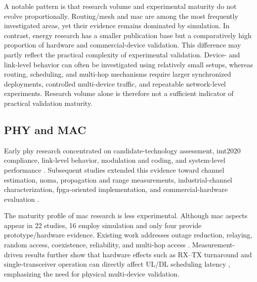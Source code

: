 \documentclass[conference]{IEEEtran}
\begin{document}
A notable pattern is that research volume and experimental maturity
do not evolve proportionally. Routing/mesh and \gls{mac} are among
the most frequently investigated areas, yet their evidence remains
dominated by simulation. In contrast, energy research has a smaller
publication base but a comparatively high proportion of hardware and
commercial-device validation. This difference may partly reflect the
practical complexity of experimental validation. Device- and
link-level behavior can often be investigated using relatively small
setups, whereas routing, scheduling, and multi-hop mechanisms require
larger synchronized deployments, controlled multi-device traffic, and
repeatable network-level experiments. Research volume alone is
therefore not a sufficient indicator of practical validation maturity.


\subsection{PHY and MAC}
\label{subsec:phy_mac}

Early \gls{phy} research concentrated on candidate-technology
assessment, \gls{imt2020} compliance, link-level behavior, modulation
and coding, and system-level performance
\cite{dhanwaniAssessmentCandidateTechnology2020,
pennerLinkLevelPerformanceEvaluation2021,
pennerURLLCPerformanceEvaluation2021,
singhwiDECT2020NewRadio2021,
maliatsosEvaluationIMT2020Candidate2022a,
smidaETSIDECT2020Component2023}.
Subsequent studies extended this evidence toward channel estimation,
\gls{noma}, propagation and range measurements, industrial-channel
characterization, \gls{fpga}-oriented implementation, and
commercial-hardware evaluation
\cite{kizilirmakExaminationPHYLayer2024,
llagunoPhysicalLayerPerformance2024,
fagerholmFPGAbasedDECT2020New2024,
wassmannPerformanceDECT2020NR2024,
haqueDECT2020NRLink2025,
liuDataAidedChannelEstimation2025,
soniLinkLevelAssessmentNOMA2023,
bandaraExperimentalValidationAnalysis2025,
grafParetoOptimalityApproach2026a,
grafWhatExpectWhen2026}.

The maturity profile of \gls{mac} research is less experimental.
Although \gls{mac} aspects appear in 22 studies, 16 employ simulation
and only four provide prototype/hardware evidence. Existing work
addresses outage reduction, relaying, random access, coexistence,
reliability, and multi-hop access
\cite{ahmadMACProtocolReducing2024,
ahmadMACLayerProtocolUltraReliable2025,
gaidamakaOptimizingDelaysRandom2025,
samuylovPerformanceAssessmentDECT20202023,
samuylovPerformanceMACLayer2024a,
samuylovEmpoweringNearURLLCIoT2025}.
Measurement-driven results further show that hardware effects such as
RX--TX turnaround and single-transceiver operation can directly affect
UL/DL scheduling latency
\cite{alizaiMeasurementDrivenLatencyAnalysis2026}, emphasizing the
need for physical multi-device validation.
\end{document}
